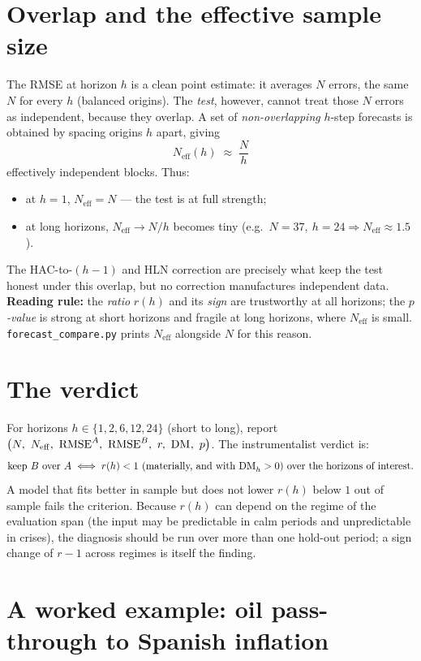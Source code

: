 \documentclass[11pt]{article}
\begin{document}
\section{Overlap and the effective sample size}

The RMSE at horizon $h$ is a clean point estimate: it averages $N$ errors, the
same $N$ for every $h$ (balanced origins). The \emph{test}, however, cannot treat
those $N$ errors as independent, because they overlap. A set of \emph{non-overlapping}
$h$-step forecasts is obtained by spacing origins $h$ apart, giving
\[
N_{\mathrm{eff}}(h) \;\approx\; \frac{N}{h}
\]
effectively independent blocks. Thus:
\begin{itemize}
\item at $h=1$, $N_{\mathrm{eff}}=N$ --- the test is at full strength;
\item at long horizons, $N_{\mathrm{eff}}\to N/h$ becomes tiny (e.g.\ $N=37,\ h=24
      \Rightarrow N_{\mathrm{eff}}\approx1.5$).
\end{itemize}
The HAC-to-$(h-1)$ and HLN correction are precisely what keep the test honest under
this overlap, but no correction manufactures independent data. \textbf{Reading
rule:} the \emph{ratio} $r(h)$ and its \emph{sign} are trustworthy at all horizons;
the \emph{$p$-value} is strong at short horizons and fragile at long horizons, where
$N_{\mathrm{eff}}$ is small. \texttt{forecast\_compare.py} prints $N_{\mathrm{eff}}$
alongside $N$ for this reason.

\section{The verdict}

For horizons $h\in\{1,2,6,12,24\}$ (short to long), report
$\big(N,\ N_{\mathrm{eff}},\ \mathrm{RMSE}^A,\ \mathrm{RMSE}^B,\ r,\ \mathrm{DM}^{\*},\ p\big)$.
The instrumentalist verdict is:
\[
\text{keep } B \text{ over } A \iff r(h)<1 \text{ (materially, and with }
\mathrm{DM}^{\*}_h>0\text{) over the horizons of interest.}
\]
A model that fits better in sample but does not lower $r(h)$ below $1$ out of
sample fails the criterion. Because $r(h)$ can depend on the regime of the
evaluation span (the input may be predictable in calm periods and unpredictable in
crises), the diagnosis should be run over more than one hold-out period; a sign
change of $r-1$ across regimes is itself the finding.

\section{A worked example: oil pass-through to Spanish inflation}
\end{document}
